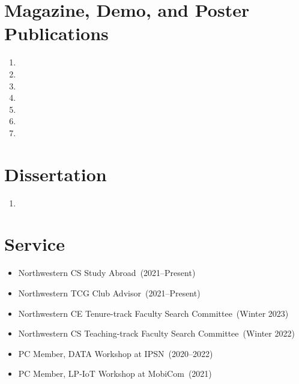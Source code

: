 \documentclass{article}
\begin{document}
\section*{Magazine, Demo, and Poster Publications}
\begin{enumerate}
  \item {}
  \item {}
  \item {}
  \item {}
  \item {}
  \item {}
  \item {}
\end{enumerate}

\section*{Dissertation}
\begin{enumerate}
  \item {}
\end{enumerate}



\section*{Service}
\begin{itemize}
  \item[] Northwestern CS Study Abroad~(2021--Present)
  \item[] Northwestern TCG Club Advisor~(2021--Present)
  \item[] Northwestern CE Tenure-track Faculty Search Committee~(Winter 2023)
  \item[] Northwestern CS Teaching-track Faculty Search Committee~(Winter 2022)
  \item[] PC Member, DATA Workshop at IPSN~(2020--2022)
  \item[] PC Member, LP-IoT Workshop at MobiCom~(2021)
\end{itemize}
\end{document}
